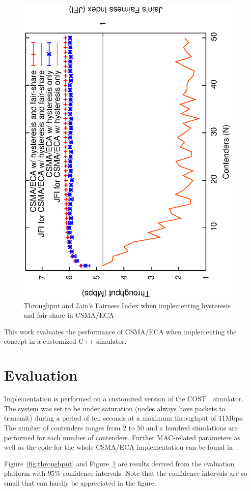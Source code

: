 \begin{figure}[htbp]
  \centering
  \includegraphics[width=0.7\linewidth, angle = -90]{figures/errorPlots/ECA-w-enhancements-NEW.eps}
  \caption{Throughput and Jain's Fairness Index when implementing hysteresis and fair-share in CSMA/ECA
  \label{fig:fairShare}}
\end{figure}

This work evaluates the performance of CSMA/ECA when implementing the concept in a customized C++ simulator.

\section{Evaluation}

Implementation is performed on a customized version of the COST~\cite{COST}~simulator. The system was set to be under saturation (nodes always have packets to transmit) during a period of ten seconds at a maximum throughput of $11$Mbps. The number of contenders ranges from $2$ to $50$ and a hundred simulations are performed for each number of contenders. Further MAC-related parameters as well as the code for the whole CSMA/ECA implementation can be found in~\cite{sim:parameters}.

Figure~\ref{fig:throughput} and Figure~\ref{fig:fairShare} are results derived from the evaluation platform with $95\%$ confidence intervals. Note that the confidence intervals are so small that can hardly be appreciated in the figure.